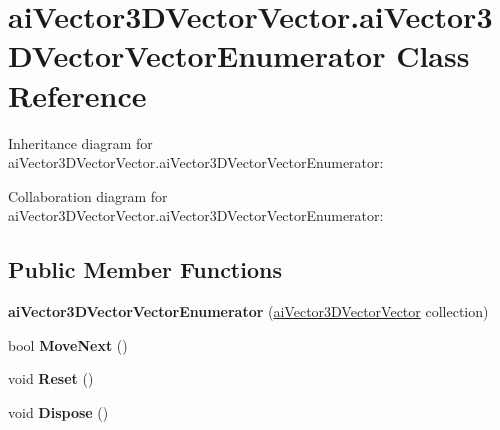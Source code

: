 \hypertarget{classai_vector3_d_vector_vector_1_1ai_vector3_d_vector_vector_enumerator}{\section{ai\+Vector3\+D\+Vector\+Vector.\+ai\+Vector3\+D\+Vector\+Vector\+Enumerator Class Reference}
\label{classai_vector3_d_vector_vector_1_1ai_vector3_d_vector_vector_enumerator}
}


Inheritance diagram for ai\+Vector3\+D\+Vector\+Vector.\+ai\+Vector3\+D\+Vector\+Vector\+Enumerator\+:


Collaboration diagram for ai\+Vector3\+D\+Vector\+Vector.\+ai\+Vector3\+D\+Vector\+Vector\+Enumerator\+:
\subsection*{Public Member Functions}
\begin{DoxyCompactItemize}
\item 
\hypertarget{classai_vector3_d_vector_vector_1_1ai_vector3_d_vector_vector_enumerator_a1366309bcd3f8a2831f4aa01212ede1a}{{\bfseries ai\+Vector3\+D\+Vector\+Vector\+Enumerator} (\hyperlink{classai_vector3_d_vector_vector}{ai\+Vector3\+D\+Vector\+Vector} collection)}\label{classai_vector3_d_vector_vector_1_1ai_vector3_d_vector_vector_enumerator_a1366309bcd3f8a2831f4aa01212ede1a}

\item 
\hypertarget{classai_vector3_d_vector_vector_1_1ai_vector3_d_vector_vector_enumerator_a6b22ce2348009e86b9417b4bb5802ed9}{bool {\bfseries Move\+Next} ()}\label{classai_vector3_d_vector_vector_1_1ai_vector3_d_vector_vector_enumerator_a6b22ce2348009e86b9417b4bb5802ed9}

\item 
\hypertarget{classai_vector3_d_vector_vector_1_1ai_vector3_d_vector_vector_enumerator_ac2001536d6acc2b45d67788b8d54ea9a}{void {\bfseries Reset} ()}\label{classai_vector3_d_vector_vector_1_1ai_vector3_d_vector_vector_enumerator_ac2001536d6acc2b45d67788b8d54ea9a}

\item 
\hypertarget{classai_vector3_d_vector_vector_1_1ai_vector3_d_vector_vector_enumerator_a230a6e72e486402d6bea76493d32ef21}{void {\bfseries Dispose} ()}\label{classai_vector3_d_vector_vector_1_1ai_vector3_d_vector_vector_enumerator_a230a6e72e486402d6bea76493d32ef21}

\end{DoxyCompactItemize}
